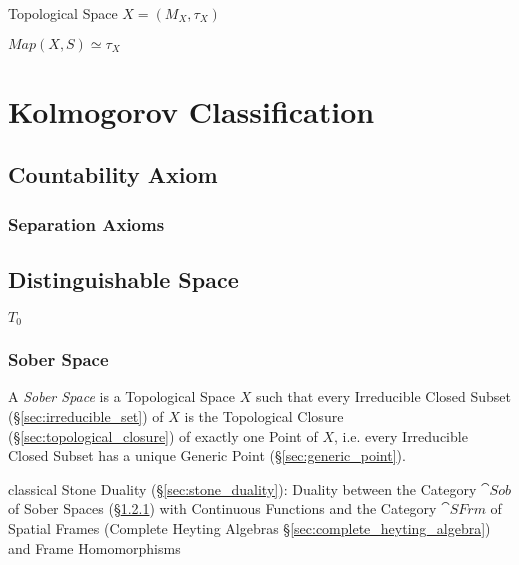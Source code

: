 Topological Space $X = (M_X,\tau_X)$

$Map(X,S) \simeq \tau_X$



\section{Kolmogorov Classification}\label{sec:kolmogorov_classification}

\subsection{Countability Axiom}\label{sec:countability_axiom}

\subsubsection{Separation Axioms}\label{sec:separation_axioms}



\subsection{Distinguishable Space}\label{sec:distinguishable_space}

$\xspace{T}_0$



\subsubsection{Sober Space}\label{sec:sober_space}

A \emph{Sober Space} is a Topological Space $X$ such that every Irreducible
Closed Subset (\S\ref{sec:irreducible_set}) of $X$ is the Topological Closure
(\S\ref{sec:topological_closure}) of exactly one Point of $X$, i.e. every
Irreducible Closed Subset has a unique Generic Point
(\S\ref{sec:generic_point}).

classical Stone Duality (\S\ref{sec:stone_duality}): Duality between the
Category $\cat{Sob}$ of Sober Spaces (\S\ref{sec:sober_space}) with Continuous
Functions and the Category $\cat{SFrm}$ of Spatial Frames (Complete Heyting
Algebras \S\ref{sec:complete_heyting_algebra}) and Frame Homomorphisms



